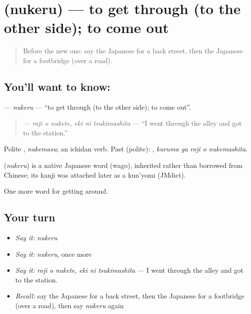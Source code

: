 \section[\texorpdfstring{\ja{ぬける} (nukeru)}{ぬける (nukeru)}]{ (nukeru) — to get through (to the other side); to come out}

\label{lesson:JA-C389-nukeru}



\begin{quote}
Before the new one: say the Japanese for a back street, then the Japanese for a footbridge (over a road).
\end{quote}

\subsection*{You'll want to know: }
\textbf{} — \emph{nukeru} — \textquotedblleft{}to get through (to the other side); to come out\textquotedblright{}.

\begin{quote}
\textbf{  } — \emph{roji o nukete, eki ni tsukimashita} — \textquotedblleft{}I went through the alley and got to the station.\textquotedblright{}
\end{quote}

Polite \textbf{}, \emph{nukemasu}; an ichidan verb. Past (polite): \textbf{  }, \emph{kuruma ga roji o nukemashita}.

\begin{cousinweb}
\textbf{} (\emph{nukeru}) is a native Japanese word (wago), inherited rather than borrowed from Chinese; its kanji was attached later as a kun'yomi (JMdict).
\end{cousinweb}

\begin{grammarlens}[title={What you've built}]
One more word for getting around.
\end{grammarlens}

\subsection*{Your turn}
\begin{itemize}
\raggedright
  \item \emph{Say it:} \emph{nukeru}
  \item \emph{Say it:} \emph{nukeru}, once more
  \item \emph{Say it:} \emph{roji o nukete, eki ni tsukimashita} — I went through the alley and got to the station.
  \item \emph{Recall:} say the Japanese for a back street, then the Japanese for a footbridge (over a road), then say \emph{nukeru} again
\end{itemize}

